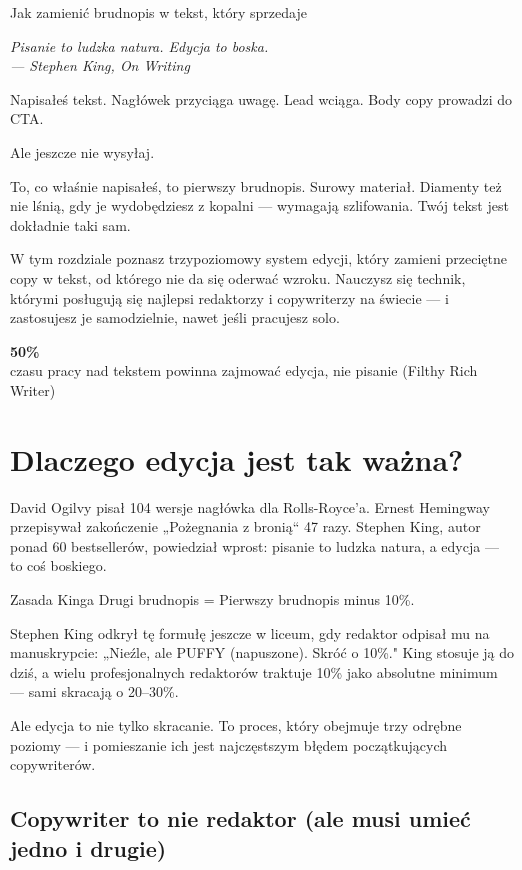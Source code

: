 \documentclass[
  12pt,
  a4paper,
  twoside,
  openright,
  12pt,
  DIV=12,
  BCOR=12mm]{scrbook}
\newcommand{\chapteropener}[1]{%
  \begin{center}
    \large\itshape\color{textmuted}#1
  \end{center}
  \vspace{1em}
}
\newcommand{\stathighlight}[2]{%
  \begin{center}
    \begin{tcolorbox}[
      enhanced,
      colback=primarylight,
      colframe=primaryblue,
      boxrule=1pt,
      arc=5pt,
      width=0.6\textwidth,
      halign=center
    ]
      {\fontsize{36}{40}\selectfont\bfseries\color{primarydark}#1}\\[5pt]
      {\color{textmuted}#2}
    \end{tcolorbox}
  \end{center}
}
\begin{document}
Jak zamienić brudnopis w tekst, który sprzedaje

\hfill\break

\chapteropener{Pisanie to ludzka natura. Edycja to boska.\\--- Stephen King, \textit{On Writing}}

Napisałeś tekst. Nagłówek przyciąga uwagę. Lead wciąga. Body copy
prowadzi do CTA.

Ale jeszcze nie wysyłaj.

To, co właśnie napisałeś, to pierwszy brudnopis. Surowy materiał.
Diamenty też nie lśnią, gdy je wydobędziesz z kopalni --- wymagają
szlifowania. Twój tekst jest dokładnie taki sam.

W tym rozdziale poznasz trzypoziomowy system edycji, który zamieni
przeciętne copy w tekst, od którego nie da się oderwać wzroku. Nauczysz
się technik, którymi posługują się najlepsi redaktorzy i copywriterzy na
świecie --- i zastosujesz je samodzielnie, nawet jeśli pracujesz solo.

\stathighlight{50\%}{czasu pracy nad tekstem powinna zajmować edycja, nie pisanie (Filthy Rich Writer)}

\section{Dlaczego edycja jest tak
ważna?}\label{dlaczego-edycja-jest-tak-waux17cna}

David Ogilvy pisał 104 wersje nagłówka dla Rolls-Royce'a. Ernest
Hemingway przepisywał zakończenie „Pożegnania z bronią`` 47 razy.
Stephen King, autor ponad 60 bestsellerów, powiedział wprost: pisanie to
ludzka natura, a edycja --- to coś boskiego.

\begin{pojecie}{Zasada Kinga}
Drugi brudnopis = Pierwszy brudnopis minus 10\%.

Stephen King odkrył tę formułę jeszcze w liceum, gdy redaktor odpisał mu na manuskrypcie: „Nieźle, ale PUFFY (napuszone). Skróć o 10\%." King stosuje ją do dziś, a wielu profesjonalnych redaktorów traktuje 10\% jako absolutne minimum --- sami skracają o 20--30\%.
\end{pojecie}

Ale edycja to nie tylko skracanie. To proces, który obejmuje trzy
odrębne poziomy --- i pomieszanie ich jest najczęstszym błędem
początkujących copywriterów.

\subsection{Copywriter to nie redaktor (ale musi umieć jedno i
drugie)}\label{copywriter-to-nie-redaktor-ale-musi-umieux107-jedno-i-drugie}
\end{document}
